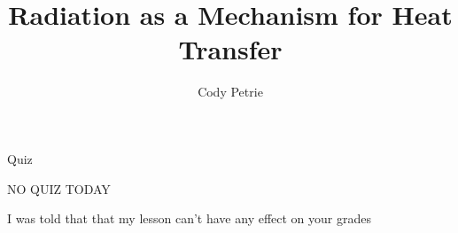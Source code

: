\documentclass{beamer}
\title[{\color{white}{Heat Transfer - Radiation}}]{Radiation as a Mechanism for Heat Transfer}
\author{Cody Petrie}
\institute{Southern Utah University}
\date{}
\begin{document}
\begin{frame}
\titlepage
\end{frame}



\begin{frame}{Quiz}
\begin{center}
{\Large NO QUIZ TODAY}
\end{center}
I was told that that my lesson can't have any effect on your grades
\end{frame}
\end{document}

